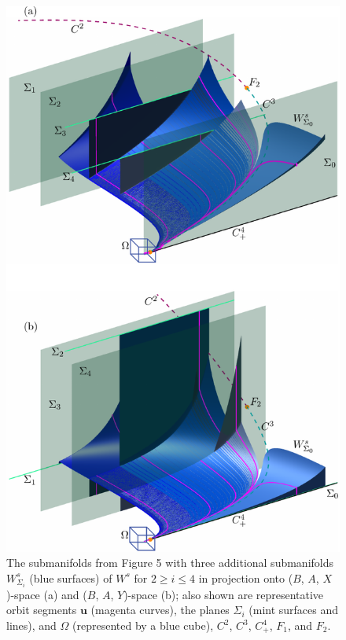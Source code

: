 \documentclass{ws-ijbc}
\begin{document}
\begin{figure}[H]
\centering
\includegraphics[]{./figures/MKMO_6.pdf}
\caption{The submanifolds from Figure 5 with three additional submanifolds $W^s_{\Sigma_i}$ (blue surfaces) of $W^s$ for $2 \geq i \leq 4$ in projection onto ($B$, $A$, $X$)-space (a) and ($B$, $A$, $Y$)-space (b); also shown are representative orbit segments $\mathbf{u}$ (magenta curves), the planes $\Sigma_i$ (mint surfaces and lines), and $\Omega$ (represented by a blue cube), $C^2$, $C^3$, $C^4_+$, $F_1$, and $F_2$.}
\label{figure_6}
\end{figure}
\end{document}
